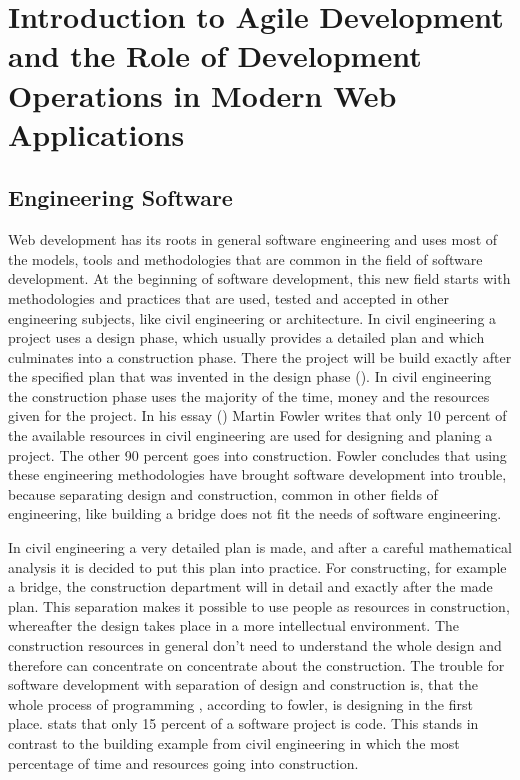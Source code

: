 \newpage

\section{Introduction to Agile Development and the Role of Development Operations in Modern Web Applications}
\label{section:Introduction to Agile Development and the Role of Development Operations in Modern Web Applications}

\subsection{Engineering Software}
Web development has its roots in general software engineering and uses most of the models, tools and methodologies that are
common in the field of software development. At the beginning of software development, this new field starts with methodologies
and practices that are used, tested and accepted in other engineering subjects, like civil engineering or architecture. In civil engineering
a project uses a design phase, which usually provides a detailed plan and which culminates into a construction phase. There the project
will be build exactly after the specified plan that was invented in the design phase (\cite{lindstrom2004extreme}).
In civil engineering the construction phase uses the majority of the time, money and the resources given for the project.
In his essay (\cite{fowler2001new}) Martin Fowler writes that only 10 percent of the available resources in civil engineering are used for
designing and planing a project. The other 90 percent goes into construction. Fowler concludes that using these engineering methodologies have
brought software development into trouble, because separating design and construction, common in other fields of engineering, like building
a bridge does not fit the needs of software engineering.

In civil engineering a very detailed plan is made, and after a careful mathematical analysis it is decided to put this plan into practice. For constructing,
for example a bridge, the construction department will in detail and exactly after the made plan.
This separation makes it possible to use people as resources in construction, whereafter the design takes place in a more
intellectual environment. The construction resources in general don't need to understand the whole design and therefore can concentrate on
concentrate about the construction. The trouble for software development with separation of design and construction is, that the whole process of programming
, according to fowler, is designing in the first place. \cite{opac-b1105529} stats that only 15 percent of a software project is code.
This stands in contrast to the building example from civil engineering in which the most percentage of time and resources going into construction.

